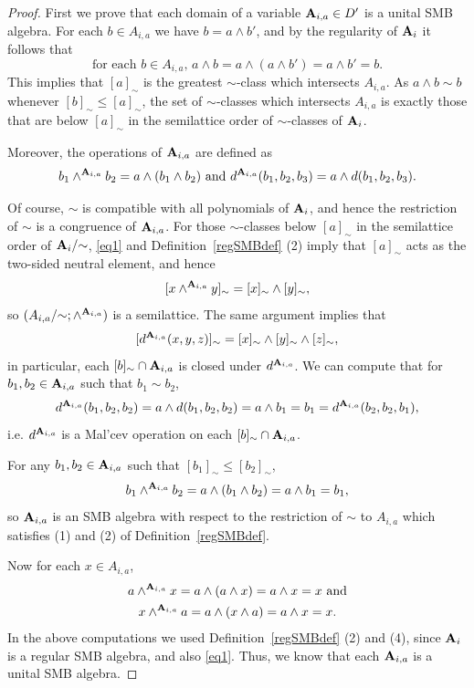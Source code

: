\documentclass[11pt]{amsart}
\newcommand{\m}[1]{{\uppercase {\mathbf {#1}}}}
\newcommand{\sm}[1]{{\mbox{\scriptsize {\uppercase {\bf {#1}}}}}}
\newcommand{\mt}{\wedge}
\theoremstyle{definition}
\begin{document}
\begin{proof}
First we prove that each domain of a variable $\m a_{i,a}\in D'$ is a unital SMB algebra. For each $b\in A_{i,a}$ we have $b=a\mt b'$, and by the regularity of $\m a_i$ it follows that 
\begin{equation}\label{eq1}\tag{*}
\text{for each }b\in A_{i,a}\text{, }a\mt b=a\mt (a\mt b') =a\mt b'=b. 
\end{equation}
This implies that $[a]_\sim$ is the greatest $\sim$-class which intersects $A_{i,a}$. As $a\mt b\sim b$ whenever $[b]_\sim\leq [a]_\sim$, the set of $\sim$-classes which intersects $A_{i,a}$ is exactly those that are below $[a]_\sim$ in the semilattice order of $\sim$-classes of $\m a_i$.

Moreover, the operations of $\m a_{i,a}$ are defined as 
$$b_1\mt^{\sm a_{i,a}} b_2=a\mt (b_1\mt b_2)\text{ and }d^{\sm a_{i,a}}(b_1,b_2,b_3)=a\mt d(b_1,b_2,b_3).$$

Of course, $\sim$ is compatible with all polynomials of $\m a_i$, and hence the restriction of $\sim$ is a congruence of $\m a_{i,a}$. For those $\sim$-classes below $[a]_\sim$ in the semilattice order of $\m a_i/{\sim}$, \eqref{eq1} and Definition~\ref{regSMBdef} (2) imply that $[a]_\sim$ acts as the two-sided neutral element, and hence
\[[x\mt^{\sm a_{i,a}} y]_\sim=[x]_\sim\mt[y]_\sim,\]
so $(A_{i,a}/{\sim};\mt^{\sm a_{i,a}})$ is a semilattice. The same argument implies that $$[d^{\sm a_{i,a}}(x,y,z)]_\sim=[x]_\sim\mt[y]_\sim\mt[z]_\sim,$$
in particular, each $[b]_\sim\cap \m a_{i,a}$ is closed under $d^{\sm a_{i,a}}$. We can compute that for $b_1,b_2\in\m a_{i,a}$ such that $b_1\sim b_2$, 
\[d^{\sm a_{i,a}}(b_1,b_2,b_2)=a\mt d(b_1,b_2,b_2)=a\mt b_1=b_1=d^{\sm a_{i,a}}(b_2,b_2,b_1),\]
i.e. $d^{\sm a_{i,a}}$ is a Mal'cev operation on each $[b]_\sim\cap \m a_{i,a}$.

For any $b_1,b_2\in\m a_{i,a}$ such that $[b_1]_\sim\leq [b_2]_\sim$,
\[b_1\mt^{\sm a_{i,a}} b_2=a\mt (b_1\mt b_2)=a\mt b_1=b_1,\]
so $\m a_{i,a}$ is an SMB algebra with respect to the restriction of $\sim$ to $A_{i,a}$ which satisfies (1) and (2) of Definition~\ref{regSMBdef}.

Now for each $x\in A_{i,a}$, 
\[
\begin{gathered}
a\mt^{\sm a_{i,a}} x=a\mt (a\mt x)=a\mt x=x \text{ and}\\
x\mt^{\sm a_{i,a}} a=a\mt (x\mt a)=a\mt x=x.
\end{gathered}
\]
In the above computations we used Definition~\ref{regSMBdef} (2) and (4), since $\m a_i$ is a regular SMB algebra, and also \eqref{eq1}. Thus, we know that each $\m a_{i,a}$ is a unital SMB algebra.


\end{proof}
\end{document}
